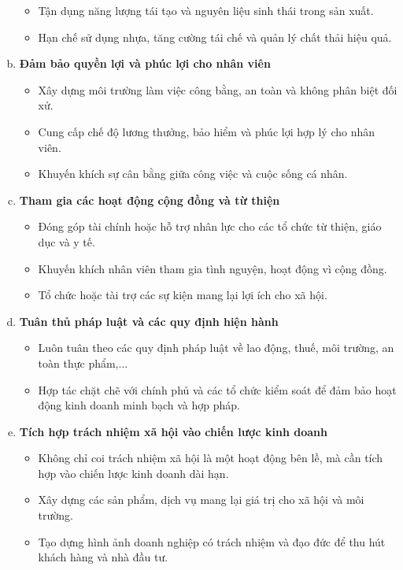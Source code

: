 \documentclass{article}
\begin{document}
\begin{enumerate}[a.]
\begin{itemize}
            \item Tận dụng năng lượng tái tạo và nguyên liệu sinh thái trong sản xuất.
            \item Hạn chế sử dụng nhựa, tăng cường tái chế và quản lý chất thải hiệu quả.
        \end{itemize}
        \item \textbf{Đảm bảo quyền lợi và phúc lợi cho nhân viên}
        \begin{itemize}
            \item Xây dựng môi trường làm việc công bằng, an toàn và không phân biệt đối xử.
            \item Cung cấp chế độ lương thưởng, bảo hiểm và phúc lợi hợp lý cho nhân viên.
            \item Khuyến khích sự cân bằng giữa công việc và cuộc sống cá nhân.
        \end{itemize}
        \item \textbf{Tham gia các hoạt động cộng đồng và từ thiện}
        \begin{itemize}
            \item Đóng góp tài chính hoặc hỗ trợ nhân lực cho các tổ chức từ thiện, giáo dục và y tế.
            \item Khuyến khích nhân viên tham gia tình nguyện, hoạt động vì cộng đồng.
            \item Tổ chức hoặc tài trợ các sự kiện mang lại lợi ích cho xã hội.
        \end{itemize}
        \item \textbf{Tuân thủ pháp luật và các quy định hiện hành}
        \begin{itemize}
            \item Luôn tuân theo các quy định pháp luật về lao động, thuế, môi trường, an toàn thực phẩm,...
            \item Hợp tác chặt chẽ với chính phủ và các tổ chức kiểm soát để đảm bảo hoạt động kinh doanh minh bạch và hợp pháp.
        \end{itemize}
        \item \textbf{Tích hợp trách nhiệm xã hội vào chiến lược kinh doanh}
        \begin{itemize}
            \item Không chỉ coi trách nhiệm xã hội là một hoạt động bên lề, mà cần tích hợp vào chiến lược kinh doanh dài hạn.
            \item Xây dựng các sản phẩm, dịch vụ mang lại giá trị cho xã hội và môi trường.
            \item Tạo dựng hình ảnh doanh nghiệp có trách nhiệm và đạo đức để thu hút khách hàng và nhà đầu tư.
        \end{itemize}
    \end{enumerate}
\end{document}

